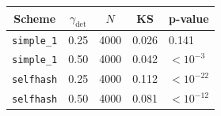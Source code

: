 \begin{tabular}{@{}ccccl@{}}
\toprule
Scheme & $\gamma_{\text{det}}$ & $N$ & KS & p-value \\
\midrule
\texttt{simple\_1} & 0.25 & 4000 & 0.026 & 0.141 \\
\texttt{simple\_1} & 0.50 & 4000 & 0.042 & $< 10^{-3}$ \\
\midrule
\texttt{selfhash} & 0.25 & 4000 & 0.112 & $< 10^{-22}$ \\
\texttt{selfhash} & 0.50 & 4000 & 0.081 & $< 10^{-12}$ \\
\bottomrule
\end{tabular}
